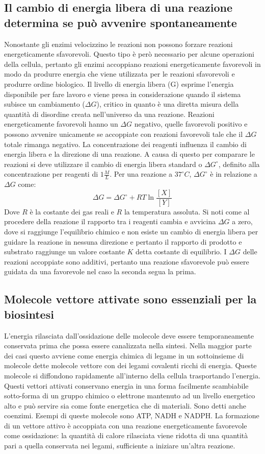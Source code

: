 \subsection{Il cambio di energia libera di una reazione determina se pu\`o avvenire spontaneamente}
Nonostante gli enzimi velocizzino le reazioni non possono forzare reazioni energeticamente sfavorevoli. Questo tipo \`e per\`o necessario per alcune operazioni della cellula, pertanto
gli enzimi accoppiano reazioni energeticamente favorevoli in modo da produrre energia che viene utilizzata per le reazioni sfavorevoli e produrre ordine biologico. Il livello di energia
libera (G) esprime l'energia disponibile per fare lavoro e viene presa in considerazione quando il sistema subisce un cambiamento ($\Delta G$), critico in quanto \`e una diretta misura
della quantit\`a di disordine creata nell'universo da una reazione. Reazioni energeticamente favorevoli hanno un $\Delta G$ negativo, quelle favorevoli positivo e possono avvenire 
unicamente se accoppiate con reazioni favorevoli tale che il $\Delta G$ totale rimanga negativo. La concentrazione dei reagenti influenza il cambio di energia libera e la direzione di 
una reazione. A causa di questo per comparare le reazioni si deve utilizzare il cambio di energia libera standard o $\Delta G^{\circ}$, definito alla concentrazione per reagenti di
$1\frac{M}{L}$. Per una reazione  a $37^\circ C$, $\Delta G^\circ$ \`e in relazione a $\Delta G$ come:
$$\Delta G = \Delta G^\circ + RT\ln\dfrac{[X]}{[Y]}$$
Dove $R$ \`e la costante dei gas reali e $R$ la temperatura assoluta. Si noti come al procedere della reazione il rapporto tra i reagenti cambia e avvicina $\Delta G$ a zero, dove si 
raggiunge l'equilibrio chimico e non esiste un cambio di energia libera per guidare la reazione in nessuna direzione e pertanto il rapporto di prodotto e substrato raggiunge un valore
costante $K$ detta costante di equilibrio. I $\Delta G$ delle reazioni accoppiate sono additivi, pertanto una reazione sfavorevole pu\`o essere guidata da una favorevole nel caso la 
seconda segua la prima. 
\subsection{Molecole vettore attivate sono essenziali per la biosintesi}
L'energia rilasciata dall'ossidazione delle molecole deve essere temporaneamente conservata prima che possa essere canalizzata nella sintesi. Nella maggior parte dei casi questo avviene
come energia chimica di legame in un sottoinsieme di molecole dette molecole vettore con dei legami covalenti ricchi di energia. Queste molecole si diffondono rapidamente all'interno 
della cellula trasportando l'energia. Questi vettori attivati conservano energia in una forma facilmente scambiabile sotto-forma di un gruppo chimico o elettrone mantenuto ad un livello
energetico alto e pu\`o servire sia come fonte energetica che di materiali. Sono detti anche coenzimi. Esempi di queste molecole sono ATP, NADH e NADPH. La formazione di un vettore 
attivo \`e accoppiata con una reazione energeticamente favorevole come ossidazione: la quantit\`a di calore rilasciata viene ridotta di una quantit\`a pari a quella conservata nei 
legami, sufficiente a iniziare un'altra reazione.

